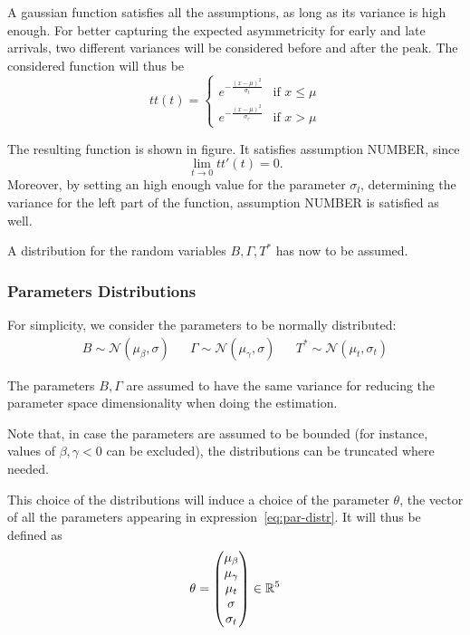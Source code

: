 A gaussian function satisfies all the assumptions,
as long as its variance is high enough.
For better capturing the expected asymmetricity for early and late arrivals,
two different variances will be considered before and after the peak.
The considered function will thus be
\begin{equation}
  \label{eq:tt_def}
  tt(t) =
  \begin{cases}
    e^{-\frac{(x - \mu)^2}{\sigma_l}} & \text{if } x \leq \mu \\
    e^{-\frac{(x - \mu)^2}{\sigma_r}} & \text{if } x > \mu
  \end{cases}
\end{equation}

The resulting function is shown in figure.
It satisfies assumption NUMBER,
since
\begin{equation*}
  \lim_{t \rightarrow 0}tt'(t) = 0.
\end{equation*}
Moreover, by setting an high enough value for the parameter \(\sigma_l\),
determining the variance for the left part of the function,
assumption NUMBER is satisfied as well.

A distribution for the random variables \(B, \Gamma, T^*\) has now to be assumed.

\subsubsection{Parameters Distributions}

For simplicity, we consider the parameters to be normally distributed:
\begin{align}
  \label{eq:par-distr}
  B \sim \mathcal{N}(\mu_\beta, \sigma) && \Gamma \sim \mathcal{N}(\mu_\gamma, \sigma) && T^* \sim \mathcal{N}(\mu_t, \sigma_t)
\end{align}

The parameters \(B, \Gamma\) are assumed to have the same variance for reducing the parameter space dimensionality when doing the estimation.

Note that, in case the parameters are assumed to be bounded
(for instance, values of \(\beta, \gamma < 0\) can be excluded),
the distributions can be truncated where needed.

This choice of the distributions will induce a choice of the parameter \(\theta\),
the vector of all the parameters appearing in expression~\eqref{eq:par-distr}.
It will thus be defined as
\begin{equation*}
  \theta =
  \begin{pmatrix}
    \mu_\beta \\
    \mu_\gamma \\
    \mu_t \\
    \sigma \\
    \sigma_t
  \end{pmatrix}
  \in \mathbb{R}^5
\end{equation*}

